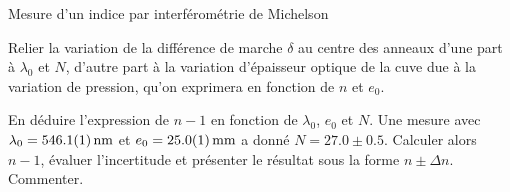 \begin{exo}[PC]{Mesure d'un indice par interférométrie de Michelson}
\begin{quest}
\item Relier la variation de la différence de marche $\delta$ au centre des anneaux d'une part à $\lambda_0$ et $N$, d'autre part à la variation d'épaisseur optique de la cuve due à la variation de pression, qu'on exprimera en fonction de $n$ et $e_0$.
\item En déduire l'expression de $n-1$ en fonction de $\lambda_0$, $e_0$ et $N$. Une mesure avec $\lambda_0=\SI{546.1\pm 0.1}{nm}$ et $e_0=\SI{25.0\pm 0.1}{mm}$ a donné $N={27.0\pm 0.5}{}$. Calculer alors $n-1$, évaluer l'incertitude et présenter le résultat sous la forme $n\pm\Delta n$. Commenter.
\end{quest}
\end{exo}

